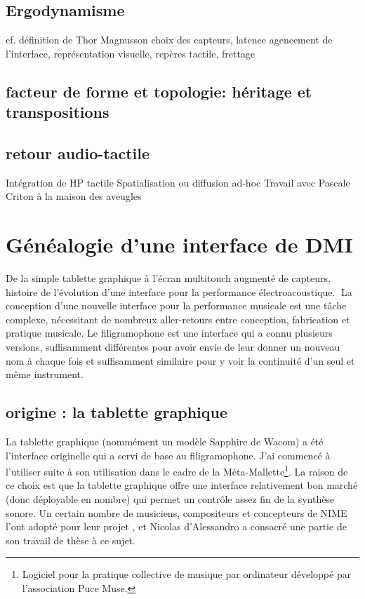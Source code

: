 \subsection{Ergodynamisme}
cf. définition de Thor Magnusson
choix des capteurs, latence
agencement de l’interface, représentation visuelle, repères tactile, frettage

\subsection{facteur de forme et topologie: héritage et transpositions}

\subsection{retour audio-tactile}
Intégration de HP tactile
Spatialisation ou diffusion ad-hoc
Travail avec Pascale Criton à la maison des aveugles


\section{Généalogie d’une interface de DMI}
\label{sec:interfaces:sec1}

De la simple tablette graphique à l’écran multitouch augmenté de capteurs, histoire de l’évolution d’une interface pour la performance électroacoustique.
La conception d’une nouvelle interface pour la performance musicale est une tâche complexe, nécessitant de nombreux aller-retours entre conception, fabrication et pratique musicale. Le filigramophone est une interface qui a connu plusieurs versions, suffisamment différentes pour avoir envie de leur donner un nouveau nom à chaque fois et suffisamment similaire pour y voir la continuité d’un seul et même instrument.

\subsection{origine : la tablette graphique}
La tablette graphique (nommément un modèle Sapphire de Wacom) a été l’interface originelle qui a servi de base au filigramophone. J’ai commencé à l’utiliser suite à son utilisation dans le cadre de la Méta-Mallette\footnote{Logiciel pour la pratique collective de musique par ordinateur développé par l’association Puce Muse.}. La raison de ce choix est que la tablette graphique offre une interface relativement bon marché (donc déployable en nombre) qui permet un contrôle assez fin de la synthèse sonore.
Un certain nombre de musiciens, compositeurs et concepteurs de NIME l’ont adopté pour leur projet \cite{Zby07}, et Nicolas d’Alessandro a consacré une partie de son travail de thèse \cite{Ale09} à ce sujet.

